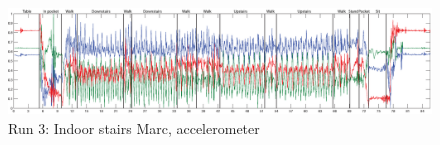 \begin{figure}
\centering
  \includegraphics[width=1\textwidth]{./Figures/chapter6/data_collection/stairs-1-marc/data_plot_acc_annotated.eps}
  \caption[R3: accelerometer]{Run 3: Indoor stairs Marc, accelerometer}
  \label{fig:data_gathering_run_3_acc}
\end{figure}